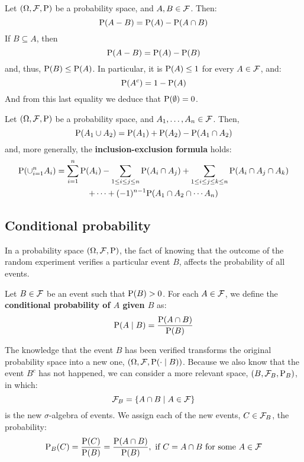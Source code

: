 \begin{prop}
	Let $(\O, \F, \P)$ be a probability space, and $A, B \in \F$. Then:
	\[
		\P(A - B) = \P(A) - \P(A \cap B)
	\]
	If $B \subseteq A$, then
	\[
		\P(A - B) = \P(A) - \P(B)
	\]
	and, thus, $\P(B) \leq \P(A)$. In particular, it is $\P(A) \leq 1$ for every $A \in \F$, and:
	\[
		\P(A^c) = 1 - \P(A)
	\]
	And from this last equality we deduce that $\P(\emptyset) = 0$.
\end{prop}

\begin{prop}
	Let $(\O, \F, \P)$ be a probability space, and $A_1, \ldots, A_n \in \F$. Then,
	\[
		\P(A_1 \cup A_2) = \P(A_1) + \P(A_2) - \P(A_1 \cap A_2)
	\]
	and, more generally, the \textbf{inclusion-exclusion formula} holds:
	\[
		\begin{gathered}
		\P(\cup_{i = 1}^n A_i) = \sum_{i = 1}^n\P(A_i) - \sum_{1 \leq i \leq j \leq n}\P(A_i \cap A_j) + \sum_{1 \leq i \leq j \leq k \leq n} \P(A_i \cap A_j \cap A_k) \\ + \cdots + (-1)^{n - 1} \P(A_1 \cap A_2 \cap \cdots A_n)
		\end{gathered}
	\]
\end{prop}

\subsection{Conditional probability}

In a probability space $(\O, \F, \P)$, the fact of knowing that the outcome of the random experiment verifies a particular event $B$, affects the probability of all events.

\begin{definition}
	Let $B \in \F$ be an event such that $\P(B) > 0$. For each $A \in \F$, we define the \textbf{conditional probability of $A$ given $B$} as:
	\[
		\P(A \mid B) = \frac{\P(A \cap B)}{\P(B)}
	\]
\end{definition}

The knowledge that the event $B$ has been verified transforms the original probability space into a new one, $(\O, \F, \P(\cdot \mid B))$. Because we also know that the event $B^c$ has not happened, we can consider a more relevant space, $(B, \F_B, \P_B)$, in which:
\[
	\F_B = \{ A \cap B \mid A \in \F \}
\]
is the new $\sigma$-algebra of events. We assign each of the new events, $C \in \F_B$, the probability:
\[
	\P_B(C) = \frac{\P(C)}{\P(B)} = \frac{\P(A \cap B)}{\P(B)}, \text{ if } C = A \cap B \text{ for some } A \in \F
\]

